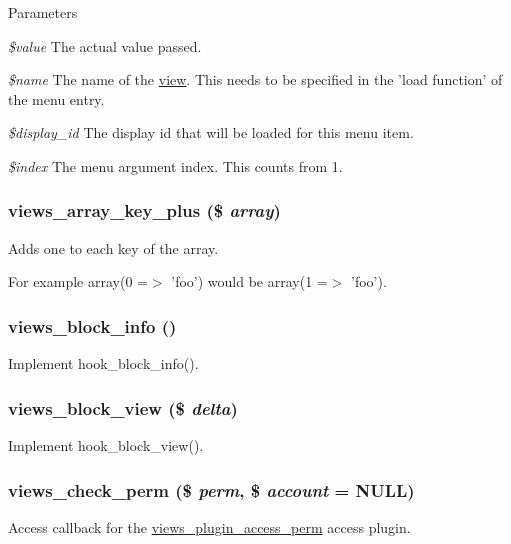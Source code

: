 \begin{DoxyParams}{Parameters}
\item[{\em \$value}]The actual value passed. \item[{\em \$name}]The name of the \hyperlink{classview}{view}. This needs to be specified in the 'load function' of the menu entry. \item[{\em \$display\_\-id}]The display id that will be loaded for this menu item. \item[{\em \$index}]The menu argument index. This counts from 1. \end{DoxyParams}
\hypertarget{views_8module_ab67b484fcc0a053477538cab840645c0}{
\subsubsection[{views\_\-array\_\-key\_\-plus}]{\setlength{\rightskip}{0pt plus 5cm}views\_\-array\_\-key\_\-plus (\$ {\em array})}}
\label{views_8module_ab67b484fcc0a053477538cab840645c0}
Adds one to each key of the array.

For example array(0 =$>$ 'foo') would be array(1 =$>$ 'foo'). \hypertarget{views_8module_a394aa81d1c40be16ebc29acb2fdae0fc}{
\subsubsection[{views\_\-block\_\-info}]{\setlength{\rightskip}{0pt plus 5cm}views\_\-block\_\-info ()}}
\label{views_8module_a394aa81d1c40be16ebc29acb2fdae0fc}
Implement hook\_\-block\_\-info(). \hypertarget{views_8module_ae2b10c93b6c54fb61100759aed3b7299}{
\subsubsection[{views\_\-block\_\-view}]{\setlength{\rightskip}{0pt plus 5cm}views\_\-block\_\-view (\$ {\em delta})}}
\label{views_8module_ae2b10c93b6c54fb61100759aed3b7299}
Implement hook\_\-block\_\-view(). \hypertarget{views_8module_aa76091b45e7d90275a77906611361832}{
\subsubsection[{views\_\-check\_\-perm}]{\setlength{\rightskip}{0pt plus 5cm}views\_\-check\_\-perm (\$ {\em perm}, \/  \$ {\em account} = {\ttfamily NULL})}}
\label{views_8module_aa76091b45e7d90275a77906611361832}
Access callback for the \hyperlink{classviews__plugin__access__perm}{views\_\-plugin\_\-access\_\-perm} access plugin.

